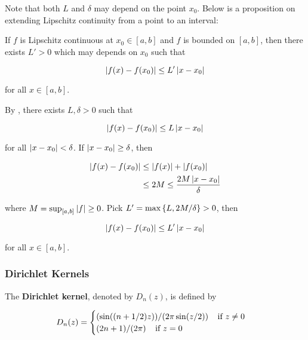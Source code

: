 \documentclass[a4paper,12pt]{article}
\begin{document}
Note that both $L$ and $\delta$ may depend on the point $x_{0}$. Below is a proposition on extending Lipschitz continuity from a point to an interval:\n

\begin{pst}
  If $f$ is Lipschitz continuous at $x_{0}\in[a,b]$ and $f$ is bounded on $[a,b]$, then there exists $L'>0$ which may depends on $x_{0}$ such that

$$\left| f(x)-f(x_{0})\right|\leq L'\left| x-x_{0}\right|$$\s

for all $x\in[a,b]$.\n

\prf By \rdft[\sctd{1}], there exists $L,\delta>0$ such that

$$\left| f(x)-f(x_{0})\right|\leq L\left| x-x_{0}\right|$$\s

for all $\left| x-x_{0}\right|<\delta$. If $\left| x-x_{0}\right|\geq\delta$, then

$$\begin{aligned}[t]
  \left| f(x)-f(x_{0})\right|&\leq\left| f(x)\right|+\left| f(x_{0})\right|\\
  &\leq 2M\leq \frac{2M\left| x-x_{0}\right|}{\delta}
\end{aligned}$$\s

where $M=\sup_{[a,b]}\left| f\right|\geq 0$. Pick $L'=\max\left\{ L,2M/\delta\right\}>0$, then

$$\left| f(x)-f(x_{0})\right|\leq L'\left| x-x_{0}\right|$$\s

for all $x\in[a,b]$.
\end{pst}

\subsubsection{Dirichlet Kernels}
\begin{dft}
  The \textbf{Dirichlet kernel}, denoted by $D_{n}(z)$, is defined by

  $$D_{n}(z)=\begin{cases}
    (\sin((n+1/2)z))/(2\pi\sin(z/2))\;\;\;\;\text{if }z\neq 0\\
    (2n+1)/(2\pi)\;\;\;\;\text{if }z=0
  \end{cases}$$
\end{dft}\n
\end{document}
